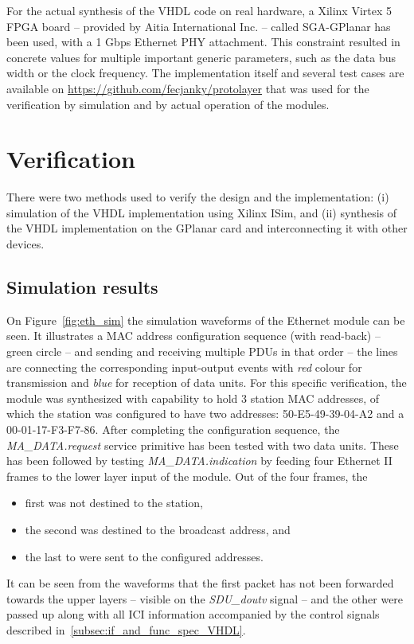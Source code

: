 \documentclass[conference]{IEEEtran}
\begin{document}
For the actual synthesis of the VHDL code on real hardware, a Xilinx Virtex 5 FPGA board -- provided by Aitia
International Inc. -- called SGA-GPlanar \cite{GPlanar} has been used, with a 1 Gbps Ethernet PHY attachment. This
constraint resulted in concrete values for multiple important generic parameters, such as the data bus width or the
clock frequency.
The implementation itself and several test cases are available on \cite{GIT_protolayer}
\url{https://github.com/fecjanky/protolayer} that was used for the verification by simulation and by actual operation
of the modules.

\section{Verification}\label{sec:Verification}

There were two methods used to verify the design and the implementation: (i) simulation of the VHDL implementation
using Xilinx ISim, and (ii) synthesis of the VHDL implementation on the GPlanar card and interconnecting it with other
devices.

\subsection{Simulation results}

On Figure~\ref{fig:eth_sim} the simulation waveforms of the Ethernet module can be seen. It illustrates a MAC address
configuration sequence (with read-back) -- green circle -- and sending and receiving multiple PDUs in that order -- the
lines are connecting the corresponding input-output events with \emph{red} colour for transmission and \emph{blue} for
reception of data units. For this specific verification, the module was synthesized with capability to hold 3 station
MAC addresses, of which the station was configured to have two addresses: 50-E5-49-39-04-A2 and a 00-01-17-F3-F7-86.
After completing the configuration sequence, the \emph{MA\_DATA.request} service primitive has been tested with two
data units. These has been followed by testing \emph{MA\_DATA.indication} by feeding four Ethernet II frames to the
lower layer input of the module. Out of the four frames, the
\begin{itemize}
    \renewcommand \labelitemi{--}
    \item first was not destined to the station,
    \item the second was destined to the broadcast address, and
    \item the last to were sent to the configured addresses.
\end{itemize}
It can be seen from the waveforms that the first packet has not been forwarded towards the upper layers -- visible on
the \emph{SDU\_doutv} signal -- and the other were passed up along with all ICI information accompanied by the control
signals described in~\ref{subsec:if_and_func_spec_VHDL}.
\end{document}
